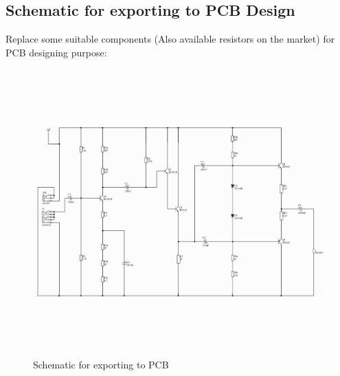 \documentclass[twoside, a4paper, leqno]{article}
\begin{document}
		\subsection{Schematic for exporting to PCB Design}
		Replace some suitable components (Also available resistors on the market) for PCB designing purpose:
		\begin{center}
			\begin{figure}[htp]
				\begin{center}
					\includegraphics[height=11cm]{figure/pcb_schem.png}
				\end{center}
				\caption{Schematic for exporting to PCB}
				\label{refFigure11}
			\end{figure}
		\end{center}
	
		\newpage
\end{document}
